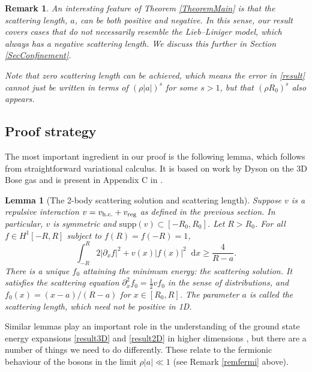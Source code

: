 \documentclass[a4paper,11pt]{article}
\newcommand{\supp}{\text{supp}}
\newcommand*\diff{\mathop{}\!\mathrm{d}}
\newtheorem{lemma}[theorem]{Lemma}
\newtheorem{remark}[theorem]{Remark}
\numberwithin{equation}{section}
\begin{document}
	\begin{remark}
		An interesting feature of Theorem \ref{TheoremMain} is that the scattering length, $a$, can be both positive and negative. In this sense, our result covers cases that do not necessarily resemble the Lieb--Liniger model, which always has a negative scattering length. We discuss this further in Section \ref{SecConfinement}. 
		
		Note that zero scattering length can be achieved, which means the error in \eqref{result} cannot just be written in terms of $(\rho|a|)^s$ for some $s>1$, but that $(\rho R_0)^s$ also appears.
	\end{remark}
	
	
	
	
	\subsection{Proof strategy}
	\label{SecProofidea}
	The most important ingredient in our proof is the following lemma, which follows from straightforward variational calculus. It is based on work by Dyson on the 3D Bose gas \cite{dyson1957ground} and is present in Appendix C in \cite{lieb2006mathematics}.
	\begin{lemma}[The 2-body scattering solution and scattering length]
		\label{lemscatlength}
		Suppose $v$ is a repulsive interaction  $v=v_{\textnormal{h.c.}}+v_{\textnormal{reg}}$ as defined in the previous section. In particular, $v$ is symmetric and $\supp(v)\subset[-R_0,R_0]$. Let $R>R_0$. For all $f\in H^1[-R,R]$ subject to $f(R)=f(-R)=1$,
		\begin{equation}
			\label{dyson1}
			\int^R_{-R}2|\partial_xf|^2+v(x)|f(x)|^2\diff x\geq \frac{4}{R-a}.
		\end{equation}
		There is a unique $f_0$ attaining the minimum energy: the scattering solution. It satisfies the scattering equation $\partial_x^2f_0=\frac12vf_0$ in the sense of distributions, and $f_0(x)=(x-a)/(R-a)$ for $x\in[R_0,R]$. The parameter $a$ is called the scattering length, which need not be positive in 1D. 
	\end{lemma}
	Similar lemmas play an important role in the understanding of the ground state energy expansions \eqref{result3D} and \eqref{result2D} in higher dimensions \cite{dyson1957ground,lieb1998ground,lieb2001ground}, but there are a number of things we need to do differently. These relate to the fermionic behaviour of the bosons in the limit $\rho|a|\ll1$ (see Remark \ref{remfermi} above). 
	
\end{document}
